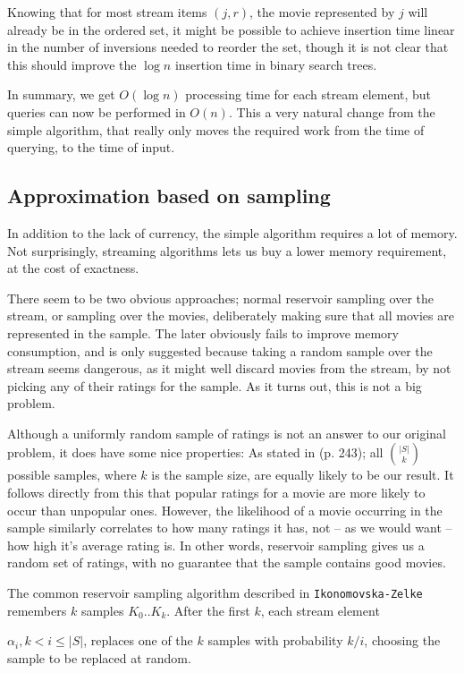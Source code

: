 Knowing that for most stream items $(j,r)$, the movie represented by
$j$ will already be in the ordered set, it might be possible to achieve
insertion time linear in the number of inversions needed to reorder the set,
though it is not clear that this should improve the $\log n$ insertion time in
binary search trees.

In summary, we get $O(\log n)$ processing time for each stream element, but
queries can now be performed in $O(n)$. This a very natural change from the
simple algorithm, that really only moves the required work from the time of
querying, to the time of input.

\subsection{Approximation based on sampling}
In addition to the lack of currency, the simple algorithm requires a lot of
memory. Not surprisingly, streaming algorithms lets us buy a lower memory
requirement, at the cost of exactness.

There seem to be two obvious approaches;
normal reservoir sampling over the stream, or sampling over the
movies, deliberately making sure that all movies are represented in the sample.
The later obviously fails to improve memory consumption, and is only suggested
because taking a random sample over the stream seems dangerous, as it might well
discard movies from the stream, by not picking any of their ratings for the
sample. As it turns out, this is not a big problem.

Although a uniformly random sample of ratings is not an answer to our original
problem, it does have some nice properties: As stated in
 (p. 243); all $|S| \choose k$ possible
samples, where $k$ is the sample size, are equally likely to be our result. It
follows directly from this that popular ratings for a movie are more likely to
occur than unpopular ones. However, the likelihood of a movie occurring in the
sample similarly correlates to how many ratings it has, not -- as we would want
-- how high it's average rating is. In other words, reservoir sampling gives us
a random set of ratings, with no guarantee that the sample contains good movies.

The common reservoir sampling algorithm described in
\texttt{Ikonomovska\--Zelke} remembers $k$ samples $K_0..K_{k}$. After the first $k$, each
stream element \raggedright{$\alpha_i, k < i \leq |S|$}, replaces one of the
$k$ samples with probability $k/i$, choosing the sample to be replaced at
random.

